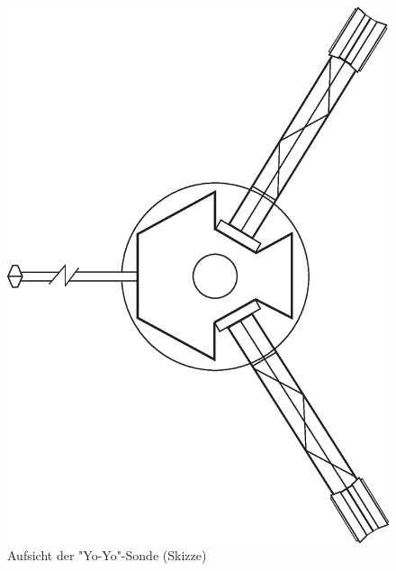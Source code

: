 \begin{figure}[htnb]
\begin{minipage}[t]{.4\linewidth}
	\centering
	\includegraphics[width=\linewidth]{images/yoyotop}
  \caption{Aufsicht der "Yo-Yo"-Sonde (Skizze)\cite{Nieto2004}}\label{fig:yoyotop}
\end{minipage}
\hfill
\begin{minipage}[t]{.4\linewidth}
	\centering

\end{minipage}
\end{figure}
